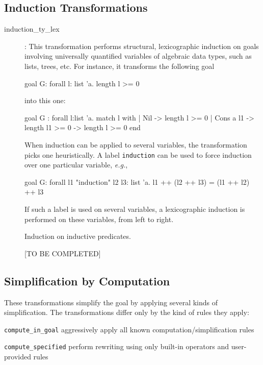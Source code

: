 \subsection{Induction Transformations}

\begin{description}
\item[induction\_ty\_lex]:
  This transformation performs structural, lexicographic induction on
  goals involving universally quantified variables of algebraic data
  types, such as lists, trees, etc. For instance, it transforms the
  following goal
\begin{whycode}
goal G: forall l: list 'a. length l >= 0
\end{whycode}
  into this one:
\begin{whycode}
goal G :
  forall l:list 'a.
     match l with
     | Nil -> length l >= 0
     | Cons a l1 -> length l1 >= 0 -> length l >= 0
     end
\end{whycode}
  When induction can be applied to several variables, the transformation
  picks one heuristically. A label \verb|induction| can be used to
  force induction over one particular variable, \emph{e.g.},
\begin{whycode}
goal G: forall l1 "induction" l2 l3: list 'a.
        l1 ++ (l2 ++ l3) = (l1 ++ l2) ++ l3
\end{whycode}
  If such a label is used on several variables, a lexicographic
  induction is performed on these variables, from left to right.

\item[] Induction on inductive predicates.

[TO BE COMPLETED]

\end{description}

\subsection{Simplification by Computation}

These transformations simplify the goal by applying several kinds of
simplification. The transformations differ only by the kind of rules they
apply:

\verb|compute_in_goal| aggressively apply all known
computation/simplification rules


\verb|compute_specified| perform rewriting using only built-in operators and
user-provided rules

